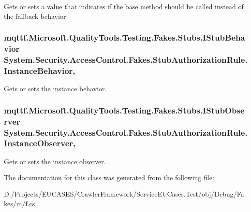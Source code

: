 Gets or sets a value that indicates if the base method should be called instead of the fallback behavior

\hypertarget{class_system_1_1_security_1_1_access_control_1_1_fakes_1_1_stub_authorization_rule_a84025f0678ca30bc8f2c41a7d6c3a0ff}{
\subsubsection[{Instance\-Behavior}]{\setlength{\rightskip}{0pt plus 5cm}mqttf.\-Microsoft.\-Quality\-Tools.\-Testing.\-Fakes.\-Stubs.\-I\-Stub\-Behavior System.\-Security.\-Access\-Control.\-Fakes.\-Stub\-Authorization\-Rule.\-Instance\-Behavior\hspace{0.3cm}{\ttfamily [get]}, {\ttfamily [set]}}}\label{class_system_1_1_security_1_1_access_control_1_1_fakes_1_1_stub_authorization_rule_a84025f0678ca30bc8f2c41a7d6c3a0ff}


Gets or sets the instance behavior.

\hypertarget{class_system_1_1_security_1_1_access_control_1_1_fakes_1_1_stub_authorization_rule_a225c94db866aac6e2585610547c682d1}{
\subsubsection[{Instance\-Observer}]{\setlength{\rightskip}{0pt plus 5cm}mqttf.\-Microsoft.\-Quality\-Tools.\-Testing.\-Fakes.\-Stubs.\-I\-Stub\-Observer System.\-Security.\-Access\-Control.\-Fakes.\-Stub\-Authorization\-Rule.\-Instance\-Observer\hspace{0.3cm}{\ttfamily [get]}, {\ttfamily [set]}}}\label{class_system_1_1_security_1_1_access_control_1_1_fakes_1_1_stub_authorization_rule_a225c94db866aac6e2585610547c682d1}


Gets or sets the instance observer.



The documentation for this class was generated from the following file\-:\begin{DoxyCompactItemize}
\item 
D\-:/\-Projects/\-E\-U\-C\-A\-S\-E\-S/\-Crawler\-Framework/\-Service\-E\-U\-Cases.\-Test/obj/\-Debug/\-Fakes/m/\hyperlink{m_2f_8cs}{f.\-cs}\end{DoxyCompactItemize}
